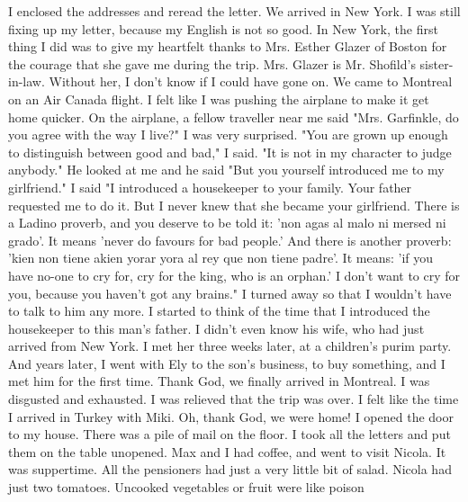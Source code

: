 I enclosed the addresses and reread the letter. 
We arrived in New York. I was still fixing up my letter, because 
my English is not so good. In New York, the first thing I did was to 
give my heartfelt thanks to Mrs. Esther Glazer of Boston for the courage 
that she gave me during the trip. Mrs. Glazer is Mr. Shofild's sister-
in-law. Without her, I don't know if I could have gone on. 
We came to Montreal on an Air Canada flight. I felt like I was 
pushing the airplane to make it get home quicker. On the airplane, 
a fellow traveller near me said "Mrs. Garfinkle, do you agree with 
the way I live?" I was very surprised. 
"You are grown up enough to distinguish between good and bad," 
I said. "It is not in my character to judge anybody." 
He looked at me and he said "But you yourself introduced me to 
my girlfriend." 
I said "I introduced a housekeeper to your family. Your father 
requested me to do it. But I never knew that she became your girlfriend. There is a Ladino proverb, and you deserve to be told it: 
'non agas al malo ni mersed ni grado'. It means 'never do favours 
for bad people.' And there is another proverb: 'kien non tiene 
akien yorar yora al rey que non tiene padre'. It means: 'if you 
have no-one to cry for, cry for the king, who is an orphan.' I don't 
want to cry for you, because you haven't got any brains." I turned 
away so that I wouldn't have to talk to him any more. I started to 
think of the time that I introduced the housekeeper to this man's 
father. I didn't even know his wife, who had just arrived from New 
York. I met her three weeks later, at a children's purim party. And 
years later, I went with Ely to the son's business, to buy something, 
and I met him for the first time. 
Thank God, we finally arrived in Montreal. I was disgusted and 
exhausted. I was relieved that the trip was over. I felt like the 
time I arrived in Turkey with Miki. Oh, thank God, we were home! 
I opened the door to my house. There was a pile of mail on 
the floor. I took all the letters and put them on the table unopened. 
Max and I had coffee, and went to visit Nicola. It was suppertime. 
All the pensioners had just a very little bit of salad. Nicola had 
just two tomatoes. Uncooked vegetables or fruit were like poison 

